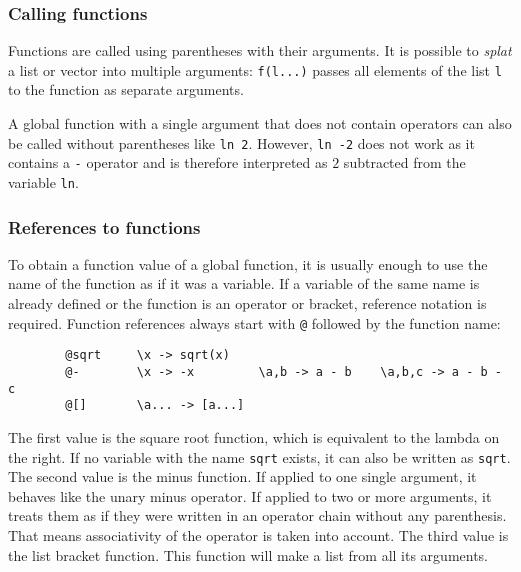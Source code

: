 \documentclass[10pt]{article}
\begin{document}
    \subsubsection{Calling functions}
    Functions are called using parentheses with their arguments.
    It is possible to \textsl{splat} a list or vector into multiple arguments:
    \verb|f(l...)| passes all elements of the list \verb|l| to the function as separate arguments.
    
    A global function with a single argument that does not contain operators can also be called without parentheses like \verb|ln 2|.
    However, \verb|ln -2| does not work as it contains a \verb|-| operator and is therefore interpreted as $ 2 $ subtracted from the variable \verb|ln|.

    \subsubsection{References to functions}
    To obtain a function value of a global function, it is usually enough to use the name of the function as if it was a variable.
    If a variable of the same name is already defined or the function is an operator or bracket, reference notation is required.
    Function references always start with \verb|@| followed by the function name:
    \begin{verbatim}
        @sqrt     \x -> sqrt(x)
        @-        \x -> -x         \a,b -> a - b    \a,b,c -> a - b - c
        @[]       \a... -> [a...]
    \end{verbatim}
    The first value is the square root function, which is equivalent to the lambda on the right.
    If no variable with the name \verb|sqrt| exists, it can also be written as \verb|sqrt|.
    The second value is the minus function.
    If applied to one single argument, it behaves like the unary minus operator.
    If applied to two or more arguments, it treats them as if they were written in an operator chain without any parenthesis.
    That means associativity of the operator is taken into account.
    The third value is the list bracket function.
    This function will make a list from all its arguments.
    
\end{document}
